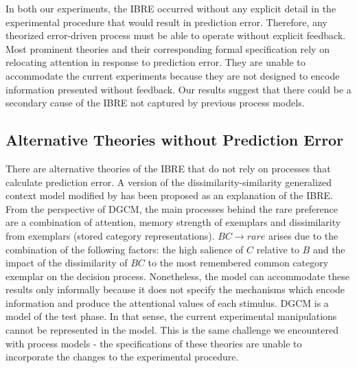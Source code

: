 \documentclass[10pt,letterpaper]{article}
\begin{document}
In both our experiments, the IBRE occurred without any explicit detail in the experimental procedure that would result in prediction error.
Therefore, any theorized error-driven process must be able to operate without explicit feedback.
Most prominent theories and their corresponding formal specification rely on relocating attention in response to prediction error.
They are unable to accommodate the current experiments because they are not designed to encode information presented without feedback.
Our results suggest that there could be a secondary cause of the IBRE not captured by previous process models.

\subsection{Alternative Theories without Prediction Error}

There are alternative theories of the IBRE that do not rely on processes that calculate prediction error.
A version of the dissimilarity-similarity generalized context model  modified by  has been proposed as an explanation of the IBRE.
From the perspective of DGCM, the main processes behind the rare preference are a combination of attention, memory strength of exemplars and dissimilarity from exemplars (stored category representations).
$BC \to rare$ arises due to the combination of the following factors: the high salience of $C$ relative to $B$ and the impact of the dissimilarity of $BC$ to the most remembered common category exemplar on the decision process.
Nonetheless, the model can accommodate these results only informally because it does not specify the mechanisms which encode information and produce the attentional values of each stimulus.
DGCM is a model of the test phase.
In that sense, the current experimental manipulations cannot be represented in the model.
This is the same challenge we encountered with process models - the specifications of these theories are unable to incorporate the changes to the experimental procedure.
\end{document}
